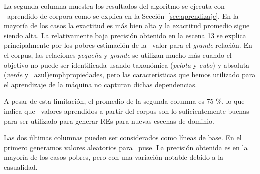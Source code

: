 
La segunda columna muestra los resultados del algoritmo se ejecuta con \puse\ aprendido de
corpora como se explica en la Secci\'on~\ref{sec:aprendizaje}. En la mayor\'{i}a de los casos la exactitud
es m\'as bien alta y la exactitud promedio sigue siendo alta. La relativamente baja precisi\'on
obtenido en la escena 13 se explica principalmente por los pobres estimaci\'on de la \puse\ valor para el \emph{grande}
relaci\'on. En el corpus, las relaciones \emph{peque\~na} y \emph{grande} se utilizan mucho m\'as cuando el objetivo no puede ser identificada usando taxon\'omica (\emph{pelota} y \emph{cubo}) y absoluta (\emph{verde} y \ {azul})emphpropiedades, pero las caracter\'{i}sticas que hemos utilizado para el aprendizaje de la m\'aquina no capturan dichas dependencias.


%
%

A pesar de esta limitaci\'on, el promedio de la segunda columna es 75 \%, lo que indica que \puse\ valores aprendidos a partir del corpus son lo suficientemente buenas para ser utilizado para generar REs para nuevas escenas de dominio.


Las dos \'ultimas columnas pueden ser considerados como l\'{i}neas de base. En el primero generamos
valores aleatorios para \ puse. La precisi\'on obtenida es en la mayor\'{i}a de los casos pobres, pero con
una variaci\'on notable debido a la casualidad.

